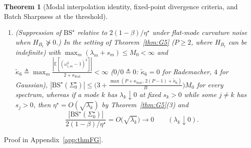 \documentclass[11pt]{article}
\newtheorem{theorem}{Theorem}
\theoremstyle{remark}
\newcommand{\E}{\mathbb{E}}
\newcommand{\tr}{\operatorname{tr}}
\begin{document}
\begin{theorem}[Modal interpolation identity, fixed-point divergence criteria, and Batch Sharpness at the threshold]
\begin{enumerate}
Whenever $H_{B_t}\succeq0$ almost surely (in particular when $H_i\succeq0$ for all $i$), $\mathrm{BS}^\star(\Sigma_0^\star)\ge\mathcal C_{\mathrm{mod}}(\Sigma_0^\star)\ge\frac{2(1-\beta)}{\eta^\star}$ (and pointwise $\frac{w^\top H_{B_t}^3w}{w^\top H_{B_t}^2w}\ge\frac{w^\top H_{B_t}^2w}{w^\top H_{B_t}w}$ on $\{H_{B_t}w\ne0\}$), and if $H_{B_t}\preceq M_{\max}I_P$ almost surely, $\mathrm{BS}^\star(\Sigma_0^\star)\le M_{\max}$. In the random-feature model of Theorem~\ref{thm:G} with $\mu_6\triangleq\max_k\E[\omega_{i,k}^6]<\infty$, let $q_{\mathrm{feat}}\triangleq 1+\frac{1+\kappa_{\mathrm{feat}}}{B}$, $r_{\mathrm{feat}}\triangleq 1+\frac{3(1+\kappa_{\mathrm{feat}})}{B}+\frac{\E[\omega_{i,k}^6]-11-6\kappa_{\mathrm{feat}}}{B^2}$, and $m_{2,\star}\triangleq\frac{\tr(H^3\Sigma_0^\star)}{\tr(H\Sigma_0^\star)}$. Then $\alpha_{\mathrm{diag}}(m_{2,\star}-a_\star^2)=\frac{\kappa_\beta}{B}\big((\tr H)a_\star-\tr(H^2)\big)$ and, for identically distributed $\omega_{i,k}$,
\begin{equation}\label{eq:bs-rf-exact}
\mathrm{BS}^\star(\Sigma_0^\star)=\mathcal C_{\mathrm{mod}}(\Sigma_0^\star)+\frac{\frac{q_{\mathrm{feat}}}{B}\tr(H^2)+q_{\mathrm{feat}}^2(m_{2,\star}-a_\star^2)+(r_{\mathrm{feat}}-q_{\mathrm{feat}}^2)m_{2,\star}}{\frac{\tr H}{B}+q_{\mathrm{feat}}a_\star},
\end{equation}
so both $\mathcal C_{\mathrm{mod}}(\Sigma_0^\star)$ and $\mathrm{BS}^\star(\Sigma_0^\star)$ converge to the two SGDM plateaus of \citet{andreyev2026momentum}: $\frac{\mathrm{BS}^\star(\Sigma_0^\star)}{2(1-\beta)/\eta^\star}=1+O(\frac{B\lambda_1}{\tr H})\to1$ as $\frac{B\lambda_1}{\tr H}\to0$, and $\frac{\mathrm{BS}^\star(\Sigma_0^\star)}{2(1+\beta)/\eta^\star}=1+O(\frac{\kappa_\beta\tr H}{B\lambda_1})\to1$ as $\frac{\kappa_\beta\tr H}{B\lambda_1}\to0$.
\item \emph{(Suppression of $\mathrm{BS}^\star$ relative to $2(1-\beta)/\eta^\star$ under flat-mode curvature noise when $H_{B_t}\not\succeq0$.)} In the setting of Theorem~\ref{thm:G5} ($P\ge2$, where $H_{B_t}$ can be indefinite) with $\max_m(\lambda_m+s_m)\le M_0<\infty$ and $\widetilde\kappa_6\triangleq\max_m\frac{|\E[(\omega_{i,m}^2-1)^3]|}{2+\kappa_{\mathrm{feat}}}<\infty$ ($0/0\triangleq0$: $\widetilde\kappa_6=0$ for Rademacher, $4$ for Gaussian), $|\mathrm{BS}^\star(\Sigma_0^\star)|\le\big(3+\frac{\max(P+\kappa_{\mathrm{feat}},\,2(P-1)+\widetilde\kappa_6)}{B}\big)M_0$ for every spectrum, whereas if a mode $k$ has $\lambda_k\downarrow0$ at fixed $s_k>0$ while some $j\ne k$ has $s_j>0$, then $\eta^\star=O(\sqrt{\lambda_k})$ by Theorem~\ref{thm:G5}(3) and
\begin{equation}\label{eq:bs-collapse}
\frac{|\mathrm{BS}^\star(\Sigma_0^\star)|}{2(1-\beta)/\eta^\star}=O\big(\sqrt{\lambda_k}\big)\longrightarrow0\qquad(\lambda_k\downarrow0).
\end{equation}
\end{enumerate}
\end{theorem}
Proof in Appendix~\ref{app:thmFG}.
\end{document}
